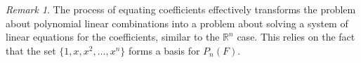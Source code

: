 \documentclass[11pt]{article}
\theoremstyle{definition}
\theoremstyle{remark}
\newtheorem{remark}[theorem]{Remark}
\begin{document}
\begin{remark}
The process of equating coefficients effectively transforms the problem about polynomial linear combinations into a problem about solving a system of linear equations for the coefficients, similar to the $\mathbb{R}^n$ case. This relies on the fact that the set $\{1, x, x^2, \dots, x^n\}$ forms a basis for $P_n(F)$.
\end{remark}
\end{document}
